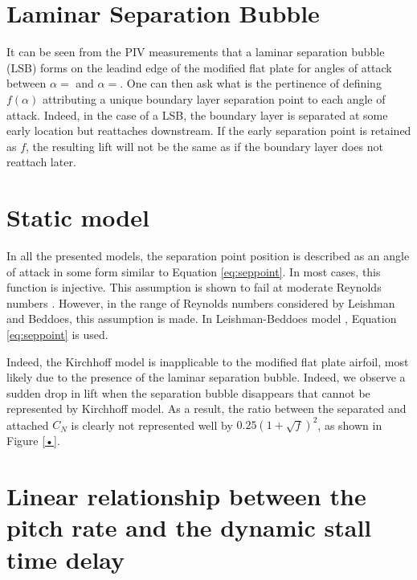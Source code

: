 

\section{Laminar Separation Bubble}
\label{LSB}

It can be seen from the PIV measurements that a laminar separation bubble (LSB) forms on the leadind edge of the modified flat plate for angles of attack between $\alpha=$ and $\alpha=$. One can then ask what is the pertinence of defining $f(\alpha)$ attributing a unique boundary layer separation point to each angle of attack. Indeed, in the case of a LSB, the boundary layer is separated at some early location but reattaches downstream. If the early separation point is retained as $f$, the resulting lift will not be the same as if the boundary layer does not reattach later. 

\section{Static model}

In all the presented models, the separation point position is described as an angle of attack in some form similar to Equation \eqref{eq:seppoint}. In most cases, this function is injective. This assumption is shown to fail at moderate Reynolds numbers \cite{tank_possibility_2017}. However, in the range of Reynolds numbers considered by Leishman and Beddoes, this assumption is made. In Leishman-Beddoes model  \cite{leishman_semi-empirical_1989}, Equation \eqref{eq:seppoint} is used.

Indeed, the Kirchhoff model is inapplicable to the modified flat plate airfoil, most likely due to the presence of the laminar separation bubble. Indeed, we observe a sudden drop in lift when the separation bubble disappears that cannot be represented by Kirchhoff model. As a result, the ratio between the separated and attached $C_N$ is clearly not represented well by $0.25(1+\sqrt{f})^2$, as shown in Figure \ref{•}.

\section{Linear relationship between the pitch rate and the dynamic stall time delay}

